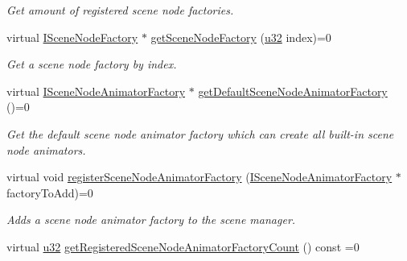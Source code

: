 \begin{DoxyCompactItemize}
\begin{DoxyCompactList}\small\item\em Get amount of registered scene node factories. \end{DoxyCompactList}\item 
virtual \hyperlink{classirr_1_1scene_1_1ISceneNodeFactory}{I\+Scene\+Node\+Factory} $\ast$ \hyperlink{classirr_1_1scene_1_1ISceneManager_ac912b9effd5ce46f5dc038e0568e614c}{get\+Scene\+Node\+Factory} (\hyperlink{namespaceirr_a0416a53257075833e7002efd0a18e804}{u32} index)=0
\begin{DoxyCompactList}\small\item\em Get a scene node factory by index. \end{DoxyCompactList}\item 
virtual \hyperlink{classirr_1_1scene_1_1ISceneNodeAnimatorFactory}{I\+Scene\+Node\+Animator\+Factory} $\ast$ \hyperlink{classirr_1_1scene_1_1ISceneManager_adeb3d24c8ffafd5e671f344931a0b3a5}{get\+Default\+Scene\+Node\+Animator\+Factory} ()=0
\begin{DoxyCompactList}\small\item\em Get the default scene node animator factory which can create all built-\/in scene node animators. \end{DoxyCompactList}\item 
virtual void \hyperlink{classirr_1_1scene_1_1ISceneManager_af48c93cc41f986f08ed964cc575ee7a0}{register\+Scene\+Node\+Animator\+Factory} (\hyperlink{classirr_1_1scene_1_1ISceneNodeAnimatorFactory}{I\+Scene\+Node\+Animator\+Factory} $\ast$factory\+To\+Add)=0
\begin{DoxyCompactList}\small\item\em Adds a scene node animator factory to the scene manager. \end{DoxyCompactList}\item 
virtual \hyperlink{namespaceirr_a0416a53257075833e7002efd0a18e804}{u32} \hyperlink{classirr_1_1scene_1_1ISceneManager_a8d694570ee1de7279727555a9ecd7bc2}{get\+Registered\+Scene\+Node\+Animator\+Factory\+Count} () const  =0\hypertarget{classirr_1_1scene_1_1ISceneManager_a8d694570ee1de7279727555a9ecd7bc2}{}\label{classirr_1_1scene_1_1ISceneManager_a8d694570ee1de7279727555a9ecd7bc2}


\end{DoxyCompactItemize}
